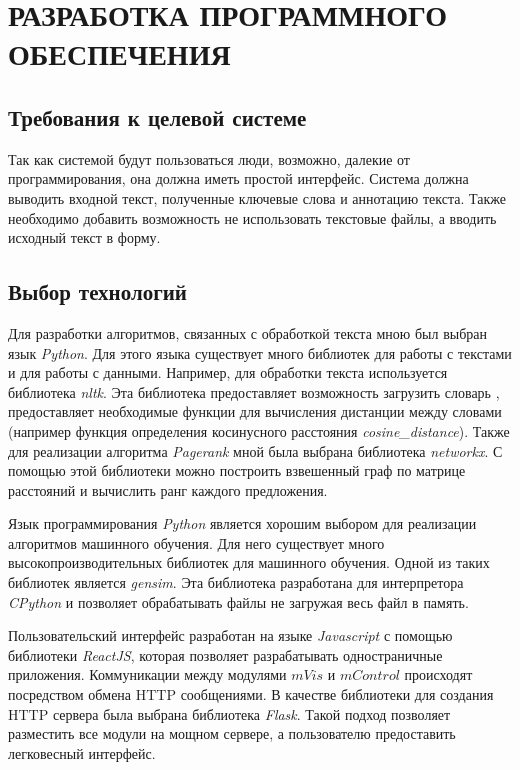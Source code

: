 \chapter{РАЗРАБОТКА ПРОГРАММНОГО ОБЕСПЕЧЕНИЯ}

\section{Требования к целевой системе}

Так как системой будут пользоваться люди, возможно, далекие от программирования, она должна иметь простой интерфейс. Система должна выводить входной текст, полученные ключевые слова и аннотацию текста. Также необходимо добавить возможность не использовать текстовые файлы, а вводить исходный текст в форму.

\section{Выбор технологий}

Для разработки алгоритмов, связанных с обработкой текста мною был выбран язык \textit{Python}. Для этого языка существует много библиотек для работы с текстами и для работы с данными. Например, для обработки текста используется библиотека \textit{nltk}. Эта библиотека предоставляет возможность загрузить словарь , предоставляет необходимые функции для вычисления дистанции между словами (например функция определения косинусного расстояния \textit{cosine\_distance}). Также для реализации алгоритма \textit{Pagerank} мной была выбрана библиотека \textit{networkx}. С помощью этой библиотеки можно построить взвешенный граф по матрице расстояний и вычислить ранг каждого предложения.

Язык программирования \textit{Python} является хорошим выбором для реализации алгоритмов машинного обучения. Для него существует много высокопроизводительных библиотек для машинного обучения. Одной из таких библиотек является \textit{gensim}. Эта библиотека разработана для интерпретора \textit{CPython} и позволяет обрабатывать файлы не загружая весь файл в память.

Пользовательский интерфейс разработан на языке \textit{Javascript} с помощью библиотеки \textit{ReactJS}, которая позволяет разрабатывать одностраничные приложения. Коммуникации между модулями $mVis$ и $mControl$ происходят посредством обмена HTTP сообщениями.
В качестве библиотеки для создания HTTP сервера была выбрана библиотека \textit{Flask}.
Такой подход позволяет разместить все модули на мощном сервере, а пользователю предоставить легковесный интерфейс.

